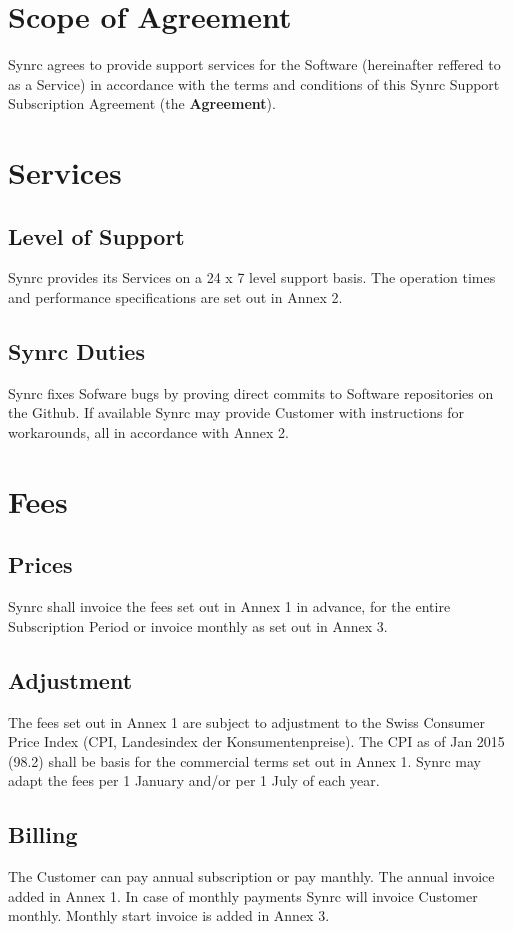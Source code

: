 \documentclass[11pt,oneside]{article}
\begin{document}
\newpage
\section{Scope of Agreement}
Synrc agrees to provide support services for the Software (hereinafter
reffered to as a Service) in accordance with the terms and conditions
of this Synrc Support Subscription Agreement (the {\bf Agreement}).

\section{Services}
\subsection{Level of Support}
Synrc provides its Services on a 24 x 7 level support basis. The operation
times and performance specifications are set out in Annex 2.
\subsection{Synrc Duties}
Synrc fixes Sofware bugs by proving direct commits to Software
repositories on the Github. If available Synrc may provide Customer
with instructions for workarounds, all in accordance with Annex 2.

\section{Fees}
\subsection{Prices}
Synrc shall invoice the fees set out in Annex 1 in advance, for the
entire Subscription Period or invoice monthly as set out in Annex 3.
\subsection{Adjustment}
The fees set out in Annex 1 are subject to adjustment to the Swiss
Consumer Price Index (CPI, Landesindex der Konsumentenpreise).
The CPI as of Jan 2015 (98.2) shall be basis for the commercial terms
set out in Annex 1. Synrc may adapt the fees per 1 January and/or
per 1 July of each year.
\subsection{Billing}
The Customer can pay annual subscription or pay manthly. The annual
invoice added in Annex 1. In case of monthly payments Synrc
will invoice Customer monthly. Monthly start invoice is added in Annex 3.
\end{document}

